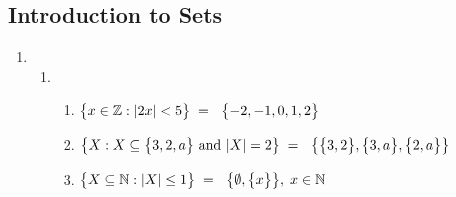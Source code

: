 \subsection*{Introduction to Sets}
\begin{enumerate}
      \item
            \begin{enumerate}[label=(\alph*), itemsep=16pt]
                  \item
                        \begin{enumerate}[label=(\roman*), itemsep=10pt]
                              \item $
                                          \bigl\{ { x \in \operatorname{\mathbb{Z}}: \lvert {2x} \rvert < 5 } \bigr\} \;=\; \
                                          \bigl\{ { -2, -1, 0, 1, 2 } \bigr\}
                                    $
                              \item $
                                          \bigl\{ { X : X \subseteq \bigl\{ {3,2,a} \bigr\} \text{ and } \lvert {X} \rvert = 2 } \bigr\} \;=\; \
                                          \bigl\{ { \bigl\{ { 3,2 } \bigr\}, \bigl\{ { 3,a } \bigr\}, \bigl\{ { 2,a } \bigr\} } \bigr\}
                                    $
                              \item $
                                          \bigl\{ { X \subseteq \operatorname{\mathbb{N}} : \lvert {X} \rvert \leq 1 } \bigr\} \;=\; \
                                          \bigl\{ { \emptyset, \bigl\{ {x} \bigr\} } \bigr\},\; x \in \operatorname{\mathbb{N}}
                                    $
                        \end{enumerate}


\end{enumerate}
\end{enumerate}
